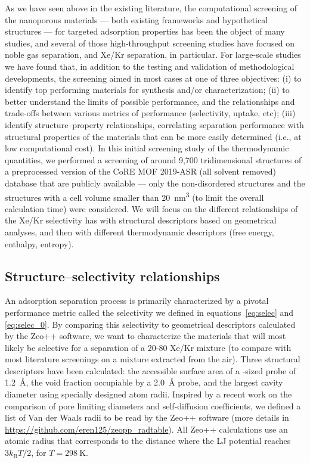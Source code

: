 \documentclass[main.tex]{subfiles}
\begin{document}
As we have seen above in the existing literature, the computational screening of the nanoporous materials --- both existing frameworks and hypothetical structures --- for targeted adsorption properties has been the object of many studies, and several of those high-throughput screening studies have focused on noble gas separation, and Xe/Kr separation, in particular. For large-scale studies we have found that, in addition to the testing and validation of methodological developments, the screening aimed in most cases at one of three objectives: (i) to identify top performing materials for synthesis and/or characterization; (ii) to better understand the limits of possible performance, and the relationships and trade-offs between various metrics of performance (selectivity, uptake, etc); (iii) identify structure--property relationships, correlating separation performance with structural properties of the materials that can be more easily determined (i.e., at low computational cost). In this initial screening study of the thermodynamic quantities, we performed a screening of around 9,700 tridimensional structures of a preprocessed version of the CoRE MOF 2019-ASR (all solvent removed) database that are publicly available --- only the non-disordered structures and the structures with a cell volume smaller than \SI{20}{\nano\meter\cubed} (to limit the overall calculation time) were considered. We will focus on the different relationships of the Xe/Kr selectivity has with structural descriptors based on geometrical analyses, and then with different thermodynamic descriptors (free energy, enthalpy, entropy). 

\subsection{Structure--selectivity relationships}

An adsorption separation process is primarily characterized by a pivotal performance metric called the selectivity we defined in equations~\ref{eq:selec} and \ref{eq:selec_0}. By comparing this selectivity to geometrical descriptors calculated by the Zeo++ software,\cite{Zeo++} we want to characterize the materials that will most likely be selective for a separation of a 20-80 Xe/Kr mixture (to compare with most literature screenings on a mixture extracted from the air). Three structural descriptors have been calculated: the accessible surface area of a -sized probe of \SI{1.2}{\angstrom}, the void fraction occupiable by a \SI{2.0}{\angstrom} probe,\cite{vol_Ongari2017} and the largest cavity diameter using specially designed atom radii. Inspired by a recent work on the comparison of pore limiting diameters and self-diffusion coefficients,\cite{Hung_2021} we defined a list of Van der Waals radii to be read by the Zeo++ software (more details in \url{https://github.com/eren125/zeopp_radtable}). All Zeo++ calculations use an atomic radius that corresponds to the distance where the LJ potential reaches $3 k_\text{B} T/2$, for $T = \SI{298}{\kelvin}$.
\end{document}
